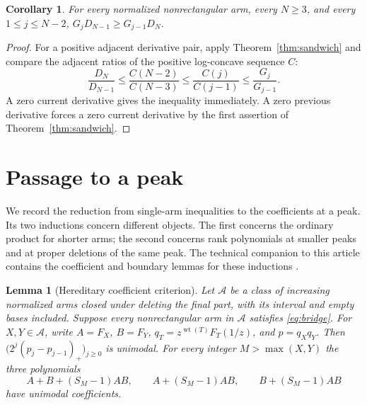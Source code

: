 \documentclass[11pt]{article}
\newtheorem{lemma}[theorem]{Lemma}
\newtheorem{corollary}[theorem]{Corollary}
\newcommand{\wt}{\operatorname{wt}}
\begin{document}
\begin{corollary}\label{cor:full}
For every normalized nonrectangular arm, every \(N\ge3\), and
every \(1\le j\le N-2\), \(G_jD_{N-1}\ge G_{j-1}D_N\).
\end{corollary}
\begin{proof}
For a positive adjacent derivative pair, apply Theorem~\ref{thm:sandwich}
and compare the adjacent ratios of the positive log-concave sequence \(C\):
\[
 \frac{D_N}{D_{N-1}}\le \frac{C(N-2)}{C(N-3)}
       \le\frac{C(j)}{C(j-1)}\le\frac{G_j}{G_{j-1}}.
\]
A zero current derivative gives the inequality immediately. A zero
previous derivative forces a zero current derivative by the first
assertion of Theorem~\ref{thm:sandwich}.
\end{proof}


\section{Passage to a peak}
We record the reduction from single-arm inequalities to the coefficients
at a peak. Its two inductions concern different objects. The first concerns
the ordinary product for shorter arms; the second concerns rank polynomials
at smaller peaks and at proper deletions of the same peak. The technical
companion to this article contains the coefficient and boundary lemmas
for these inductions \cite{companion}.

\begin{lemma}[Hereditary coefficient criterion]\label{lem:criterion}
Let \(\mathcal A\) be a class of increasing normalized arms closed under
deleting the final part, with its interval and empty bases included. Suppose
every nonrectangular arm in \(\mathcal A\) satisfies \eqref{eq:bridge}.
For \(X,Y\in\mathcal A\), write \(A=F_X\), \(B=F_Y\),
\(q_T=z^{\wt(T)}F_T(1/z)\), and \(p=q_Xq_Y\). Then
\(\bigl(2^j(p_j-p_{j-1})_+\bigr)_{j\ge0}\) is unimodal.
For every integer \(M>\max(X,Y)\) the three polynomials
\begin{equation}
      A+B+(S_M-1)AB,\qquad A+(S_M-1)AB,\qquad B+(S_M-1)AB
                                                                  \label{eq:peak}
\end{equation}
have unimodal coefficients.
\end{lemma}
\end{document}
